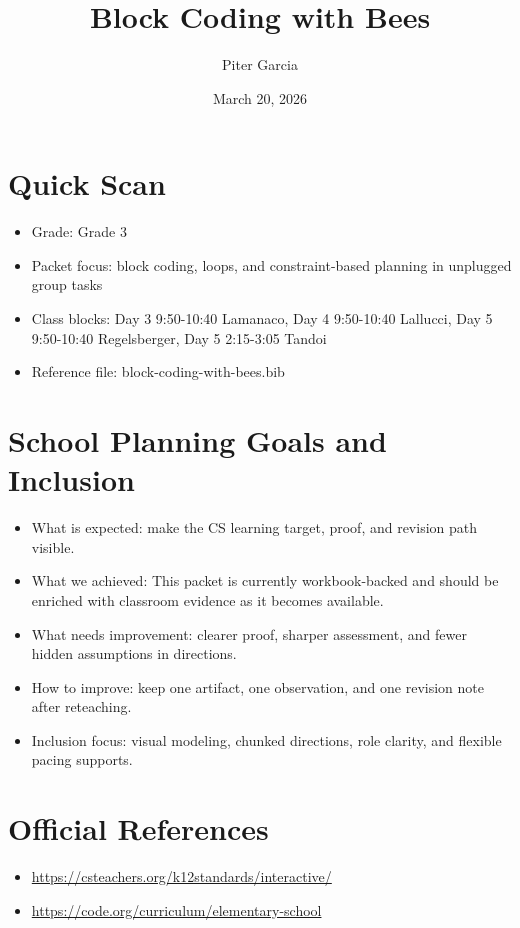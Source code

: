 \documentclass[11pt]{article}
\title{Block Coding with Bees}
\author{Piter Garcia}
\date{March 20, 2026}
\begin{document}
\maketitle
\section*{Quick Scan}
\begin{itemize}[leftmargin=*]
\item Grade: Grade 3
\item Packet focus: block coding, loops, and constraint-based planning in unplugged group tasks
\item Class blocks: Day 3 9:50-10:40 Lamanaco, Day 4 9:50-10:40 Lallucci, Day 5 9:50-10:40 Regelsberger, Day 5 2:15-3:05 Tandoi
\item Reference file: block-coding-with-bees.bib
\end{itemize}
\section*{School Planning Goals and Inclusion}
\begin{itemize}[leftmargin=*]
\item What is expected: make the CS learning target, proof, and revision path visible.
\item What we achieved: This packet is currently workbook-backed and should be enriched with classroom evidence as it becomes available.
\item What needs improvement: clearer proof, sharper assessment, and fewer hidden assumptions in directions.
\item How to improve: keep one artifact, one observation, and one revision note after reteaching.
\item Inclusion focus: visual modeling, chunked directions, role clarity, and flexible pacing supports.
\end{itemize}
\section*{Official References}
\begin{itemize}[leftmargin=*]
\item \url{https://csteachers.org/k12standards/interactive/}
\item \url{https://code.org/curriculum/elementary-school}
\end{itemize}
\end{document}

